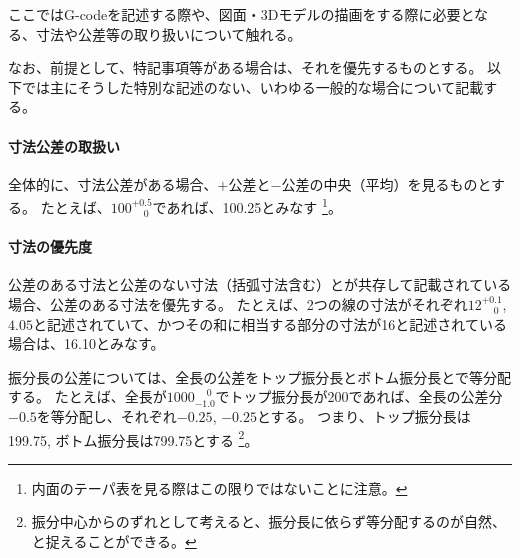 
ここではG-codeを記述する際や、図面・3Dモデルの描画をする際に必要となる、寸法や公差等の取り扱いについて触れる。

なお、前提として、特記事項等がある場合は、それを優先するものとする。
以下では主にそうした特別な記述のない、いわゆる一般的な場合について記載する。




\paragraph*{寸法公差の取扱い}
全体的に、寸法公差がある場合、$+$公差と$-$公差の中央（平均）を見るものとする。
たとえば、$100^{+0.5}_{\phantom -0}$であれば、100.25とみなす
\footnote{内面のテーパ表を見る際はこの限りではないことに注意。}。

\paragraph*{寸法の優先度}
公差のある寸法と公差のない寸法（括弧寸法含む）とが共存して記載されている場合、公差のある寸法を優先する。
たとえば、2つの線の寸法がそれぞれ$12^{+0.1}_{\phantom -0}$, $4.05$と記述されていて、かつその和に相当する部分の寸法が16と記述されている場合は、16.10とみなす。




振分長の公差については、全長の公差をトップ振分長とボトム振分長とで等分配する。
たとえば、全長が$1000^{\phantom +0}_{-1.0}$でトップ振分長が200であれば、全長の公差分$-0.5$を等分配し、それぞれ$-0.25$, $-0.25$とする。
つまり、トップ振分長は199.75, ボトム振分長は799.75とする
\footnote{振分中心からのずれとして考えると、振分長に依らず等分配するのが自然、と捉えることができる。}。

